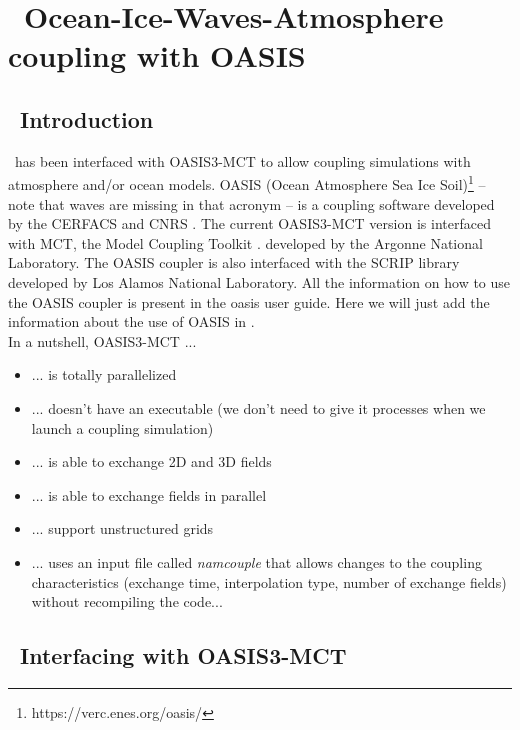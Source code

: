 \pagestyle{myheadings} \setcounter{page}{1} \setcounter{footnote}{0}

\section{~Ocean-Ice-Waves-Atmosphere coupling with OASIS} \label{app:coupling}
\newcounters 

\vssub
\subsection{~Introduction} \label{sec:couplingA}
\vssub

\ws\ has been interfaced with OASIS3-MCT to allow coupling simulations with atmosphere and/or ocean models.
OASIS (Ocean Atmosphere Sea Ice Soil)\footnote{https://verc.enes.org/oasis/} -- note that waves are missing in that acronym -- is a coupling software developed by the CERFACS and CNRS \citep{art:VAL13}.
The current OASIS3-MCT version is interfaced with MCT, the Model Coupling Toolkit \citep{art:LJO05,art:JLO05}.
developed by the Argonne National Laboratory.
The OASIS coupler is also interfaced with the SCRIP library developed by Los Alamos National Laboratory. All the information on how to use the OASIS coupler is present in the oasis user guide. Here we will just add the information about the use of OASIS in \ws.\\

In a nutshell, OASIS3-MCT ...

\begin{itemize}
  \item ... is totally parallelized
  \item ... doesn't have an executable (we don't need to give it processes when we launch a coupling simulation)
  \item ... is able to exchange 2D and 3D fields
  \item ... is able to exchange fields in parallel
  \item ... support unstructured grids
  \item ... uses an input file called \textit{namcouple} that allows changes to the coupling characteristics (exchange time, interpolation type, number of exchange fields) without recompiling the code...
\end{itemize}

\vssub
\subsection{~Interfacing with OASIS3-MCT} \label{sec:couplingB}
\vssub

